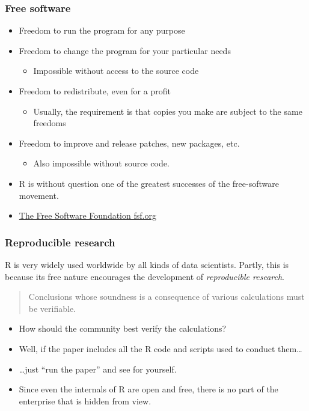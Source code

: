 \documentclass[11pt,ignorenonframetext,aspectratio=169]{beamer}
\begin{document}
\begin{frame}\frametitle{Free software}

\begin{itemize}[<+->]

\item
  Freedom to run the program for any purpose
\item
  Freedom to change the program for your particular needs

  \begin{itemize}[<+->]
  
  \item
    Impossible without access to the source code
  \end{itemize}
\item
  Freedom to redistribute, even for a profit

  \begin{itemize}[<+->]
  
  \item
    Usually, the requirement is that copies you make are subject to the
    same freedoms
  \end{itemize}
\item
  Freedom to improve and release patches, new packages, etc.

  \begin{itemize}[<+->]
  
  \item
    Also impossible without source code.
  \end{itemize}
\item
  R is without question one of the greatest successes of the
  free-software movement.
\item
  \href{http://fsf.org/}{The Free Software Foundation fsf.org}
\end{itemize}

\end{frame}

\begin{frame}\frametitle{Reproducible research}

R is very widely used worldwide by all kinds of data scientists. Partly,
this is because its free nature encourages the development of
\emph{reproducible research}.

\begin{quote}
Conclusions whose soundness is a consequence of various calculations
must be verifiable.
\end{quote}

\begin{itemize}[<+->]

\item
  How should the community best verify the calculations?
\item
  Well, if the paper includes all the R code and scripts used to conduct
  them\ldots{}
\item
  \ldots{}just ``run the paper'' and see for yourself.
\item
  Since even the internals of R are open and free, there is no part of
  the enterprise that is hidden from view.
\end{itemize}

\end{frame}
\end{document}
